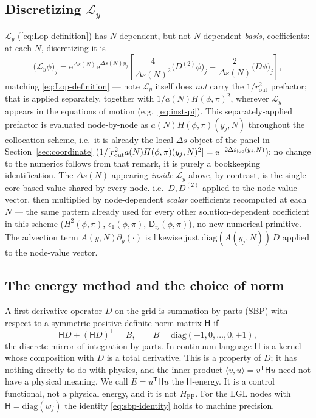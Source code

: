 \documentclass[a4paper,11pt]{article}
\newcommand{\transpose}{\mathsf{T}}
\newcommand{\e}[1]{\mathrm{e}^{{#1}}}
\newcommand{\Ny}{N}                          %
\newcommand{\epsSR}{\epsilon_1}              %
\newcommand{\Hub}{H}                         %
\newcommand{\sfactor}{a}                     %
\newcommand{\atloc}{(\field,\mom)}           %
\newcommand{\field}{\phi}                    %
\newcommand{\mom}{\pi}                       %
\newcommand{\rad}{r}                         %
\newcommand{\yco}{y}                         %
\newcommand{\rout}{\rad_{\mathrm{out}}}      %
\newcommand{\aHloc}{\sfactor(\Ny)\Hub\atloc} %
\newcommand{\Deltas}{\Delta s}                %
\newcommand{\advcoef}{A}                     %
\newcommand{\Lop}{\mathcal{L}_\yco}          %
\newcommand{\Dcm}[1]{\mathsf{D}_{#1}}        %
\newcommand{\Hfp}{H_{\mathrm{FP}}}            %
\newcommand{\Hen}{E}                          %
\newcommand{\Hnorm}{\mathsf{H}}               %
\begin{document}
\subsection{Discretizing $\Lop$}

$\Lop$ (\eqref{eq:Lop-definition}) has $\Ny$-dependent, but not
$\Ny$-dependent-\emph{basis}, coefficients: at each $\Ny$, discretizing it
is
\begin{equation}
    \big(\Lop\field\big)_j
    =
    \e{\Deltas(\Ny)}\e{\Deltas(\Ny)\yco_j}
    \left[\frac{4}{\Deltas(\Ny)^2}\big(D^{(2)}\field\big)_j - \frac{2}{\Deltas(\Ny)}\big(D\field\big)_j\right] ,
\end{equation}
matching \eqref{eq:Lop-definition} --- note $\Lop$ itself does \emph{not}
carry the $1/\rout^2$ prefactor; that is applied separately, together with
$1/\aHloc^2$, wherever $\Lop$ appears in the equations of motion (e.g.\
\eqref{eq:inst-pi}). This separately-applied prefactor is evaluated node-by-node as
$\aHloc(\yco_j,\Ny)$ throughout the collocation scheme, i.e.\ it is already
the local-$\Deltas$ object of the panel in Section~\ref{sec:coordinate}
($1/[\rout^2\aHloc(\yco_j,\Ny)^2]=\e{-2\Deltas_{\rm loc}(\yco_j,\Ny)}$); no
change to the numerics follows from that remark, it is purely a
bookkeeping identification. The $\Deltas(\Ny)$ appearing \emph{inside}
$\Lop$ above, by contrast, is the single core-based value shared by every
node.
i.e.\ $D,D^{(2)}$ applied to the node-value vector, then multiplied by
node-dependent \emph{scalar} coefficients recomputed at each $\Ny$ --- the
same pattern already used for every other solution-dependent coefficient
in this scheme ($\Hub^2\atloc$, $\epsSR\atloc$, $\Dcm{ij}\atloc$), no new
numerical primitive. The advection term $\advcoef(\yco,\Ny)\partial_\yco(\cdot)$
is likewise just $\mathrm{diag}(\advcoef(\yco_j,\Ny))\,D$ applied to the
node-value vector.

\subsection{The energy method and the choice of norm}
\label{sec:energy-method}

A first-derivative operator $D$ on the grid is summation-by-parts (SBP)
with respect to a symmetric positive-definite norm matrix $\Hnorm$ if
\begin{equation}
    \Hnorm D + (\Hnorm D)^{\transpose} = B , \qquad B = \mathrm{diag}(-1,0,\dots,0,+1) ,
    \label{eq:sbp-identity}
\end{equation}
the discrete mirror of integration by parts. In continuum language
$\Hnorm$ is a kernel whose composition with $D$ is a total derivative.
This is a property of $D$; it has nothing directly to do with physics,
and the inner product $\langle v,u\rangle=v^{\transpose}\Hnorm u$ need not
have a physical meaning. We call $\Hen=u^{\transpose}\Hnorm u$ the
$\Hnorm$-energy. It is a control functional, not a physical energy, and it
is not $\Hfp$. For the LGL nodes with $\Hnorm=\mathrm{diag}(w_j)$ the
identity \eqref{eq:sbp-identity} holds to machine precision.
\end{document}
